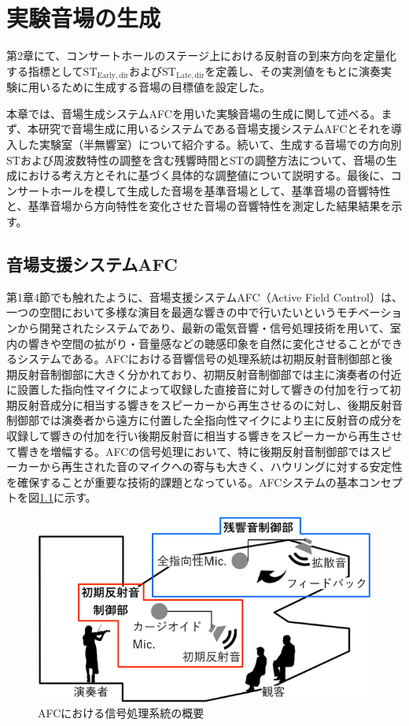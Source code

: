 \documentclass[11pt,a4j]{jreport}
\begin{document}
\chapter{実験音場の生成}

第2章にて、コンサートホールのステージ上における反射音の到来方向を定量化する指標として$\mathrm{ST_{Early,dir}}$および$\mathrm{ST_{Late,dir}}$を定義し、その実測値をもとに演奏実験に用いるために生成する音場の目標値を設定した。

本章では、音場生成システムAFCを用いた実験音場の生成に関して述べる。まず、本研究で音場生成に用いるシステムである音場支援システムAFCとそれを導入した実験室（半無響室）について紹介する。続いて、生成する音場での方向別STおよび周波数特性の調整を含む残響時間とSTの調整方法について、音場の生成における考え方とそれに基づく具体的な調整値について説明する。最後に、コンサートホールを模して生成した音場を基準音場として、基準音場の音響特性と、基準音場から方向特性を変化させた音場の音響特性を測定した結果結果を示す。


\section{音場支援システムAFC}
第1章4節でも触れたように、音場支援システムAFC（Active Field Control）は、一つの空間において多様な演目を最適な響きの中で行いたいというモチベーションから開発されたシステムであり、最新の電気音響・信号処理技術を用いて、室内の響きや空間の拡がり・音量感などの聴感印象を自然に変化させることができるシステムである\cite{AFC}。AFCにおける音響信号の処理系統は初期反射音制御部と後期反射音制御部に大きく分かれており、初期反射音制御部では主に演奏者の付近に設置した指向性マイクによって収録した直接音に対して響きの付加を行って初期反射音成分に相当する響きをスピーカーから再生させるのに対し、後期反射音制御部では演奏者から遠方に付置した全指向性マイクにより主に反射音の成分を収録して響きの付加を行い後期反射音に相当する響きをスピーカーから再生させて響きを増幅する。AFCの信号処理において、特に後期反射音制御部ではスピーカーから再生された音のマイクへの寄与も大きく、ハウリングに対する安定性を確保することが重要な技術的課題となっている。AFCシステムの基本コンセプトを図\ref{fig:AFCにおける信号処理の概要}に示す。

\begin{figure}[H]
  \centering
  \includegraphics[width=0.8\linewidth]{images/AFCsystemOverView.png}
  \caption{AFCにおける信号処理系統の概要}
  \label{fig:AFCにおける信号処理の概要}
\end{figure}
\end{document}
